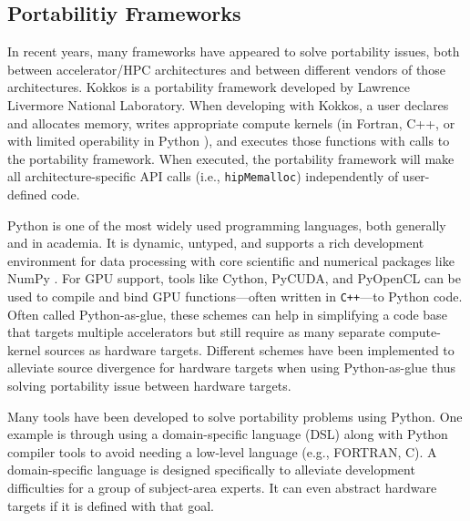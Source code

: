 \subsection{Portabilitiy Frameworks}

In recent years, many frameworks have appeared to solve portability issues, both between accelerator/HPC architectures and between different vendors of those architectures. 
Kokkos \cite{kokkos} is a portability framework developed by Lawrence Livermore National Laboratory.
When developing with Kokkos, a user declares and allocates memory, writes appropriate compute kernels (in Fortran, C++, or with limited operability in Python \cite{AlAwarETAL21PyKokkos}), and executes those functions with calls to the portability framework. 
When executed, the portability framework will make all architecture-specific API calls (i.e., \texttt{hipMemalloc}) independently of user-defined code.


Python is one of the most widely used programming languages, both generally and in academia.
It is dynamic, untyped, and supports a rich development environment for data processing with core scientific and numerical packages like NumPy \cite{van_der_walt_numpy_2011}.
For GPU support, tools like Cython, PyCUDA, and PyOpenCL \cite{kloeckner_pycuda_2012} can be used to compile and bind GPU functions---often written in \texttt{C++}---to Python code.
Often called Python-as-glue, these schemes can help in simplifying a code base that targets multiple accelerators but still require as many separate compute-kernel sources as hardware targets.
Different schemes have been implemented to alleviate source divergence for hardware targets when using Python-as-glue thus solving portability issue between hardware targets.

Many tools have been developed to solve portability problems using Python.
One example is through using a domain-specific language (DSL) along with Python compiler tools to avoid needing a low-level language (e.g., FORTRAN, C).
A domain-specific language is designed specifically to alleviate development difficulties for a group of subject-area experts. 
It can even abstract hardware targets if it is defined with that goal.

